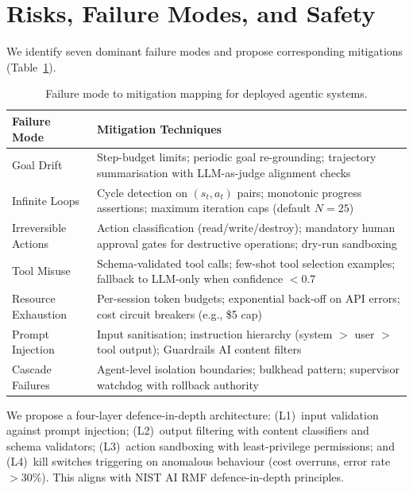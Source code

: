 \documentclass[sn-basic]{sn-jnl}
\theoremstyle{definition}
\begin{document}
\section{Risks, Failure Modes, and Safety}\label{sec:risks}

We identify seven dominant failure modes and propose corresponding mitigations (Table~\ref{tab:failures}).

\begin{table}[ht]
\centering
\caption{Failure mode to mitigation mapping for deployed agentic systems.}
\label{tab:failures}
\begin{tabular}{p{2.5cm}p{9cm}}
\toprule
\textbf{Failure Mode} & \textbf{Mitigation Techniques} \\
\midrule
Goal Drift & Step-budget limits; periodic goal re-grounding; trajectory summarisation with LLM-as-judge alignment checks \\
Infinite Loops & Cycle detection on $(s_t, a_t)$ pairs; monotonic progress assertions; maximum iteration caps (default $N{=}25$) \\
Irreversible Actions & Action classification (read/write/destroy); mandatory human approval gates for destructive operations; dry-run sandboxing \\
Tool Misuse & Schema-validated tool calls; few-shot tool selection examples; fallback to LLM-only when confidence $< 0.7$ \\
Resource Exhaustion & Per-session token budgets; exponential back-off on API errors; cost circuit breakers (e.g., \$5 cap) \\
Prompt Injection & Input sanitisation; instruction hierarchy (system $>$ user $>$ tool output); Guardrails AI content filters \\
Cascade Failures & Agent-level isolation boundaries; bulkhead pattern; supervisor watchdog with rollback authority \\
\bottomrule
\end{tabular}
\end{table}

We propose a four-layer defence-in-depth architecture: (L1)~input validation against prompt injection; (L2)~output filtering with content classifiers and schema validators; (L3)~action sandboxing with least-privilege permissions; and (L4)~kill switches triggering on anomalous behaviour (cost overruns, error rate $>$30\%). This aligns with NIST AI RMF \citep{nist2023ai} defence-in-depth principles.

\end{document}
